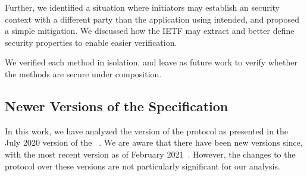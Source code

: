 \documentclass[a4paper,twoside,draft]{article}
\begin{document}
Further, we identified a situation where initiators may establish an \mOscore{}
security context with a different party than the application using \mEdhoc{}
intended, and proposed a simple mitigation.
%
We discussed how the IETF may extract and better define security properties to
enable easier verification.

We verified each method in isolation, and leave as future work to verify whether
the methods are secure under composition.

\subsection{Newer Versions of the Specification} \label{sec:newdrafts}
In this work, we have analyzed the version of the \mEdhoc{} protocol as
presented in the July 2020 version of the
\mSpec{}~\cite{our-analysis-selander-lake-edhoc-00}.
%
We are aware that there have been new versions since,
with the most recent version as
of February 2021~\cite{latest-ietf-lake-edhoc-05}.
%
However, the changes to the protocol over these versions are not
particularly significant for our analysis.
%

%






\appendix
\end{document}
